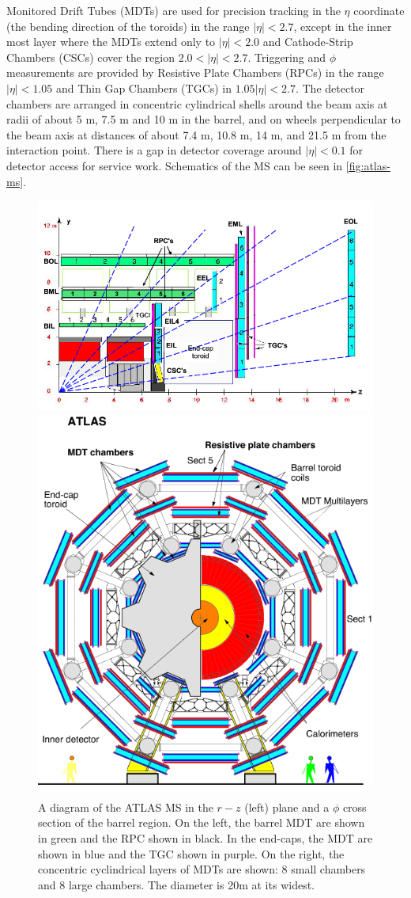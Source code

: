 Monitored Drift Tubes (MDTs) are used for precision tracking in the $\eta$ coordinate (the bending direction of the toroids) in the range $|\eta| < 2.7$, except in the inner most layer where the \ac{MDT}s extend only to $|\eta| < 2.0$ and Cathode-Strip Chambers (CSCs) cover the region $2.0 < |\eta| < 2.7$. Triggering and $\phi$ measurements are provided by Resistive Plate Chambers (RPCs) in the range $|\eta| < 1.05$ and Thin Gap Chambers (TGCs) in $1.05 |\eta| < 2.7$. The detector chambers are arranged in concentric cylindrical shells around the beam axis at radii of about 5 m, 7.5 m and 10 m in the barrel, and on wheels perpendicular to the beam axis at distances of about 7.4 m, 10.8 m, 14 m, and 21.5 m from the interaction point. There is a gap in detector coverage around $|\eta| < 0.1$ for detector access for service work. Schematics of the \ac{MS} can be seen in \autoref{fig:atlas-ms}.  

\begin{figure}[!h]
\centering
\includegraphics[width=.6\textwidth]{figures/Detector/atlas-ms.png}
\includegraphics[width=.3\textwidth]{figures/Detector/mdt-phi.png}
\caption{A diagram of the \ac{ATLAS} \ac{MS} in the $r-z$ (left) plane and a $\phi$ cross section of the barrel region. On the left, the barrel \ac{MDT} are shown in green and the \ac{RPC} shown in black. In the end-caps, the \ac{MDT} are shown in blue and the \ac{TGC} shown in purple. On the right, the concentric cyclindrical layers of \ac{MDT}s are shown: 8 small chambers and 8 large chambers. The diameter is 20m at its widest. \cite{ms-vertices}}
\label{fig:atlas-ms}
\end{figure}



